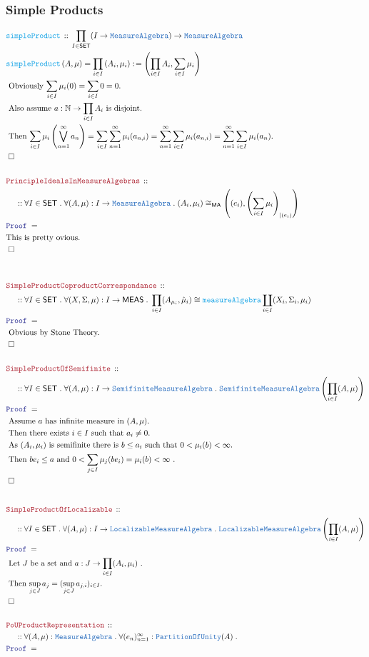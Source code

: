 \documentclass[12pt]{scrartcl}
\newcommand{\TYPE}[1]{\textcolor{NavyBlue}{\mathtt{#1}}}
\newcommand{\FUNC}[1]{\textcolor{Cerulean}{\mathtt{#1}}}
\newcommand{\LOGIC}[1]{\textcolor{Blue}{\mathtt{#1}}}
\newcommand{\THM}[1]{\textcolor{Maroon}{\mathtt{#1}}}
\renewcommand{\.}{\; . \;}
\newcommand{\de}{: \kern 0.1pc =}
\newcommand{\Act}[1]{\left( #1 \right)}
\newcommand{\Theorem}[2]{& \THM{#1} \, :: \, #2 \\ & \Proof = \\ }
\newcommand{\DeclareFunc}[2]{& \FUNC{#1} \, :: \, #2 \\}
\newcommand{\DefineNamedFunc}[4]{&  \FUNC{#1}\Act{#2} = #3 \de #4 \\}
\newcommand{\NewLine}{\\ & \kern 1pc}
\newcommand{\Page}[1]{ \begin{align*} #1 \end{align*}   }
\newcommand{\Nat}{\mathbb{N} }
\newcommand{\QED}{\; \square}
\newcommand{\EndProof}{& \QED \\}
\newcommand{\Proof}{\LOGIC{Proof} \; }
\newcommand{\Explain}[1]{& \text{#1.} \\}
\newcommand{\SET}{\mathsf{SET}}
\newcommand{\PoU}{\TYPE{PartitionOfUnity}}
\newcommand{\Semifinite}{\TYPE{Semifinite}}
\newcommand{\Loc}{\TYPE{Localizable}}
\newcommand{\MEAS}{\mathsf{MEAS}}
\newcommand{\MA}{\TYPE{MeasureAlgebra}}
\begin{document}
\subsubsection{Simple Products}
\Page{
	 \DeclareFunc{simpleProduct}
	 {
	 	\prod_{I \in \SET} (I \to \MA) \to \MA
	 }
	 \DefineNamedFunc{simpleProduct}{A,\mu}{\prod_{i \in I} \left( A_i,  \mu_i \right)}
	 {
		\left( \prod_{i \in I} A_i, \sum_{i \in I} \mu_i \right)	 
	 }
	 \Explain{ Obviously $\sum_{i \in I} \mu_i (0) = \sum_{i \in I} 0 = 0$}
	 \Explain{ Also assume $a : \Nat \to \prod_{i \in I} A_i$ is disjoint}
	 \Explain{ Then  
			$\sum_{i \in I} \mu_i\left( \bigvee^\infty_{n=1} a_n \right) =
			 \sum_{i \in I} \sum^\infty_{n=1} \mu_i( a_{n,i} ) =
			 \sum^\infty_{n=1} \sum_{i \in I} \mu_i( a_{n,i} ) =
			 \sum^\infty_{n=1} \sum_{i \in I} \mu_i (a_n)  			
			$}
	\EndProof
	\\
	\Theorem{PrincipleIdealsInMeasureAlgebras}
	{		
		\NewLine ::		
		\forall I \in \SET \.
		\forall (A,\mu) : I \to \MA \.
		(A_i,\mu_i) \cong_{\mathsf{MA}} \left( (e_i), \left(\sum_{i \in I} \mu_i\right)_{|(e_i)}  \right)
	}
	\Explain{This is pretty ovious}
	\EndProof
	\\
	\\
	\Theorem{SimpleProductCoproductCorrespondance}
	{		
		\NewLine ::		
		\forall I \in \SET \.
		\forall (X,\Sigma,\mu) : I \to \MEAS \.
		\prod_{i \in I} (A_{\mu_i}, \hat \mu_i) \cong  
		\FUNC{measureAlgebra} \coprod_{i \in I} (X_i,\Sigma_i,\mu_i)
	}
	\Explain{ Obvious by Stone Theory}
	\EndProof
	\\
	\Theorem{SimpleProductOfSemifinite}
	{
		\NewLine ::
		\forall I \in \SET \.
		\forall (A,\mu) : I \to \Semifinite\MA \.
		\Semifinite\MA\left( \prod_{i \in I} (A,\mu) \right)
	}
	\Explain{ Assume $a$ has infinite measure in $(A,\mu)$}
	\Explain{ Then there exists $i \in I$ such that $a_i \neq 0$}
	\Explain{ As $(A_i,\mu_i)$ is semifinite there is $b \le a_i$ such that $0 < \mu_i(b) < \infty $}
	\Explain{ Then $be_i \le a$ and $0 < \sum_{j \in I} \mu_j (be_i) = \mu_i(b) < \infty$ }
	\EndProof
	\\	
}\Page{
	\Theorem{SimpleProductOfLocalizable}
	{
		\NewLine ::
		\forall I \in \SET \.
		\forall (A,\mu) : I \to \Loc\MA \.
		\Loc\MA\left( \prod_{i \in I} (A,\mu) \right)
	}
	\Explain{ Let $J$ be a set and $a : J \to \prod_{i \in I} (A_i,\mu_i)$ }
	\Explain{ Then $\sup_{j \in J} a_j = (\sup_{j \in J} a_{j,i} )_{i \in I}$}
	\EndProof
	\\
	\Theorem{PoUProductRepresentation}
	{
		\NewLine ::
		\forall (A,\mu) : \MA \.
		\forall (e_n)^\infty_{n=1} : \PoU(A) \.
}}
\end{document}
